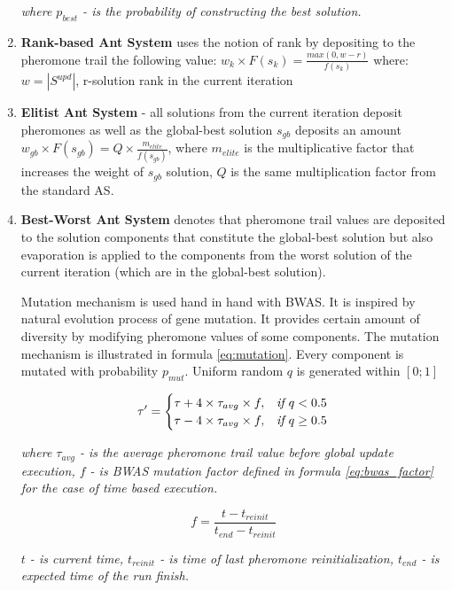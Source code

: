 \documentclass[12pt,a4paper,oneside]{book}
\begin{document}
\begin{enumerate}
\textit{where $p_{best}$ - is the probability of constructing the best solution.}

\item {\textbf{Rank-based Ant System} uses the notion of rank by depositing to the pheromone trail the following value:
$w_k \times F(s_k) = \frac{max(0,w-r)}{f(s_k)}$
where: $w=|S^{upd}|$, r-solution rank in the current iteration
}

\item {\textbf{Elitist Ant System} - all solutions from the current iteration deposit pheromones as well as the global-best solution $s_{gb}$ deposits an amount $w_{gb} \times F(s_{gb}) = Q \times \frac{m_{elite}}{f(s_{gb})}$, where $m_{elite}$ is the multiplicative factor that increases the weight of $s_{gb}$ solution, $Q$ is the same multiplication factor from the standard AS.}

\item \textbf{Best-Worst Ant System} denotes that pheromone trail values are deposited to the solution components that constitute the global-best solution but also evaporation is applied to the components from the worst solution of the current iteration (which are in the global-best solution).

Mutation mechanism is used hand in hand with BWAS. It is inspired by natural evolution process of gene mutation. It provides certain amount of diversity by modifying pheromone values of some components. The mutation mechanism is illustrated in formula \eqref{eq:mutation}. Every component is mutated with probability $p_{mut}$. Uniform random $q$ is generated within $[0;1]$

\begin{equation}
\tau' = \begin{cases}
\tau + 4 \times \tau_{avg} \times f, & \textit{if } q < 0.5 \\
\tau - 4 \times \tau_{avg} \times f, & \textit{if } q \ge 0.5
\end{cases} \\
\label{eq:mutation}
\end{equation}

\textit{where $\tau_{avg}$ - is the average pheromone trail value before global update execution, $f$ - is BWAS mutation factor defined in formula \eqref{eq:bwas_factor} for the case of time based execution.}

\begin{equation}
f = \frac{t - t_{reinit}}{t_{end} - t_{reinit}}
\label{eq:bwas_factor}
\end{equation}

\textit{$t$ - is current time, $t_{reinit}$ - is time of last pheromone reinitialization, $t_{end}$ - is expected time of the run finish.}

\end{enumerate}
\end{document}
